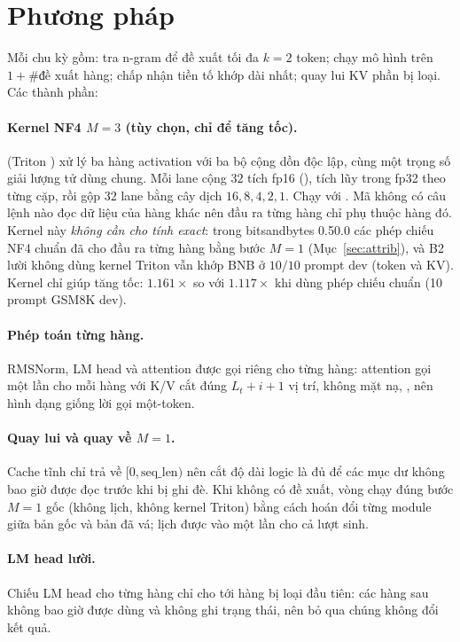 \section{Phương pháp}\label{sec:method}
Mỗi chu kỳ gồm: tra n-gram để đề xuất tối đa $k{=}2$ token; chạy mô hình trên $1{+}\#\text{đề xuất}$ hàng; chấp nhận tiền tố khớp dài nhất; quay lui KV phần bị loại. Các thành phần:

\paragraph{Kernel NF4 $M{=}3$ (tùy chọn, chỉ để tăng tốc).}  (Triton \cite{tillet2019triton}) xử lý ba hàng activation với ba bộ cộng dồn độc lập, cùng một trọng số giải lượng tử dùng chung. Mỗi lane cộng $32$ tích fp16 (), tích lũy trong fp32 theo từng cặp, rồi gộp $32$ lane bằng cây dịch $16,8,4,2,1$. Chạy với . Mã không có câu lệnh nào đọc dữ liệu của hàng khác nên đầu ra từng hàng chỉ phụ thuộc hàng đó. Kernel này \emph{không cần cho tính exact}: trong bitsandbytes 0.50.0 các phép chiếu NF4 chuẩn đã cho đầu ra từng hàng bằng bước $M{=}1$ (Mục~\ref{sec:attrib}), và B2 lười không dùng kernel Triton vẫn khớp BNB ở $10/10$ prompt dev (token và KV). Kernel chỉ giúp tăng tốc: $1.161\times$ so với $1.117\times$ khi dùng phép chiếu chuẩn (10 prompt GSM8K dev).

\paragraph{Phép toán từng hàng.} RMSNorm, LM head và attention được gọi riêng cho từng hàng: attention gọi  một lần cho mỗi hàng với K/V cắt đúng $L_t{+}i{+}1$ vị trí, không mặt nạ, , nên hình dạng giống lời gọi một-token.

\paragraph{Quay lui và quay về $M{=}1$.} Cache tĩnh chỉ trả về $[0,\text{seq\_len})$ nên cắt độ dài logic là đủ để các mục dư không bao giờ được đọc trước khi bị ghi đè. Khi không có đề xuất, vòng chạy đúng bước $M{=}1$ gốc (không lịch, không kernel Triton) bằng cách hoán đổi  từng module giữa bản gốc và bản đã vá; lịch được vào một lần cho cả lượt sinh.

\paragraph{LM head lười.} Chiếu LM head cho từng hàng chỉ cho tới hàng bị loại đầu tiên: các hàng sau không bao giờ được dùng và không ghi trạng thái, nên bỏ qua chúng không đổi kết quả.

